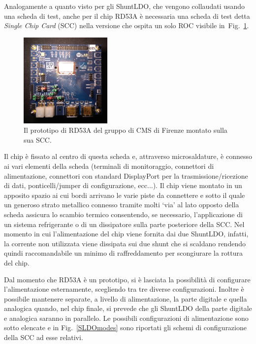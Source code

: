 Analogamente a quanto visto per gli ShuntLDO, che vengono collaudati usando una scheda di test, anche per il chip RD53A è necessaria una scheda di test detta \textit{Single Chip Card} (SCC) nella versione che ospita un solo ROC visibile in~Fig.~\ref{fig:RD53onSCC}.
\begin{figure}[t]
\centering
\includegraphics[width=0.4\textwidth]{Immagini/RD53onSCC.jpg}
\caption{Il prototipo di RD53A del gruppo di CMS di Firenze montato sulla sua SCC.}
\label{fig:RD53onSCC}
\end{figure}
 Il chip è fissato al centro di questa scheda e, attraverso microsaldature, è connesso ai vari elementi della scheda (terminali di monitoraggio, connettori di alimentazione, connettori con standard DisplayPort per la trasmissione/ricezione di dati, ponticelli/jumper di configurazione, ecc...). 
Il chip viene montato in un apposito spazio ai cui bordi arrivano le varie piste da connettere e sotto il quale un generoso strato metallico connesso tramite molti `via' al lato opposto della scheda assicura lo scambio termico consentendo, se necessario, l'applicazione di un sistema refrigerante o di un dissipatore sulla parte posteriore della SCC. 
Nel momento in cui l'alimentazione del chip viene fornita dai due ShuntLDO, infatti, la corrente non utilizzata viene dissipata sui due shunt che si scaldano rendendo quindi raccomandabile un minimo di raffreddamento per scongiurare la rottura del chip.

Dal momento che RD53A è un prototipo, si è lasciata la possibilità di configurare l'alimentazione esternamente, scegliendo tra tre diverse configurazioni.
Inoltre è possibile mantenere separate, a livello di alimentazione, la parte digitale e quella analogica quando, nel chip finale, si prevede che gli ShuntLDO della parte digitale e analogica saranno in parallelo. Le possibili configurazioni di alimentazione sono sotto elencate e in Fig.~\ref{SLDOmodes} sono riportati gli schemi di configurazione della SCC ad esse relativi.

